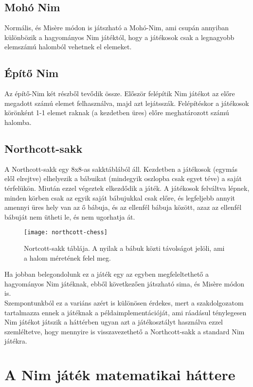 \subsection{Mohó Nim}
Normális, és Misère módon is játszható a Mohó-Nim, ami csupán annyiban különbözik a hagyományos Nim játéktól, hogy a játékosok csak a legnagyobb elemszámú halomból vehetnek el elemeket.

\subsection{Építő Nim}
Az építő-Nim két részből tevődik össze. Először felépítik Nim játékot az előre megadott számú elemet felhasználva, majd azt lejátsszák. Felépítéskor a játékosok körönként 1-1 elemet raknak (a kezdetben üres) előre meghatározott számú halomba.

\subsection{Northcott-sakk}
A Northcott-sakk egy 8x8-as sakktáblából áll. Kezdetben a játékosok (egymás elől elrejtve) elhelyezik a bábuikat (mindegyik oszlopba csak egyet téve) a saját térfelükön. Miután ezzel végeztek elkezdődik a játék. A játékosok felváltva lépnek, minden körben csak az egyik saját bábujukkal csak előre, és legfeljebb annyit amennyi üres hely van az ő bábuja, és az ellenfél bábuja között, azaz az ellenfél bábuját nem ütheti le, és nem ugorhatja át.\\

\begin{figure}[h]
	\texttt{[image: northcott-chess]}
	\centering
	\caption{Nortcott-sakk táblája. A nyilak a bábuk közti távolságot jelöli, ami a halom méretének felel meg.}
\end{figure}

Ha jobban belegondolunk ez a játék egy az egyben megfeleltethető a hagyományos Nim játéknak, ebből következően játszható sima, és Misère módon is.\\ 
Szempontunkból ez a variáns azért is különösen érdekes, mert a szakdolgozatom tartalmazza ennek a játéknak a példaimplementációját, ami ráadásul ténylegesen Nim játékot játszik a háttérben ugyan azt a játékosztályt használva ezzel szemléltetve, hogy mennyire is visszavezethető a Northcott-sakk a standard Nim játékra.

\section{A Nim játék matematikai háttere}


